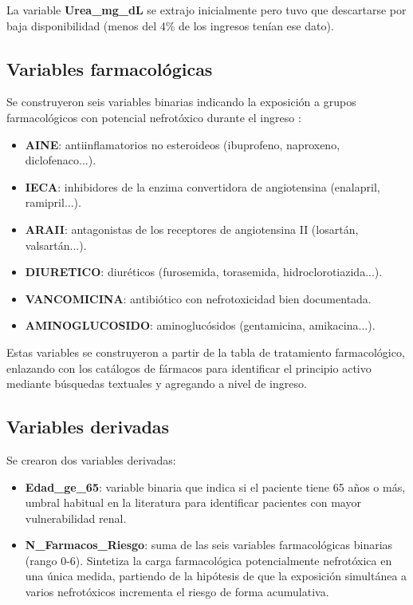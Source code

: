 \documentclass[12pt, a4paper, oneside]{report}
\begin{document}
La variable \textbf{Urea\_mg\_dL} se extrajo inicialmente pero tuvo que descartarse por baja disponibilidad (menos del 4\% de los ingresos tenían ese dato).

\subsection{Variables farmacológicas}

Se construyeron seis variables binarias indicando la exposición a grupos farmacológicos con potencial nefrotóxico durante el ingreso \parencite{perazella2019drug, perazella2022drugaki}:

\begin{itemize}
    \item \textbf{AINE}: antiinflamatorios no esteroideos (ibuprofeno, naproxeno, diclofenaco...).
    \item \textbf{IECA}: inhibidores de la enzima convertidora de angiotensina (enalapril, ramipril...).
    \item \textbf{ARAII}: antagonistas de los receptores de angiotensina II (losartán, valsartán...).
    \item \textbf{DIURETICO}: diuréticos (furosemida, torasemida, hidroclorotiazida...).
    \item \textbf{VANCOMICINA}: antibiótico con nefrotoxicidad bien documentada.
    \item \textbf{AMINOGLUCOSIDO}: aminoglucósidos (gentamicina, amikacina...).
\end{itemize}

Estas variables se construyeron a partir de la tabla de tratamiento farmacológico, enlazando con los catálogos de fármacos para identificar el principio activo mediante búsquedas textuales y agregando a nivel de ingreso.

\subsection{Variables derivadas}

Se crearon dos variables derivadas:

\begin{itemize}
    \item \textbf{Edad\_ge\_65}: variable binaria que indica si el paciente tiene 65 años o más, umbral habitual en la literatura para identificar pacientes con mayor vulnerabilidad renal.
    \item \textbf{N\_Farmacos\_Riesgo}: suma de las seis variables farmacológicas binarias (rango 0-6). Sintetiza la carga farmacológica potencialmente nefrotóxica en una única medida, partiendo de la hipótesis de que la exposición simultánea a varios nefrotóxicos incrementa el riesgo de forma acumulativa.
\end{itemize}
\end{document}
